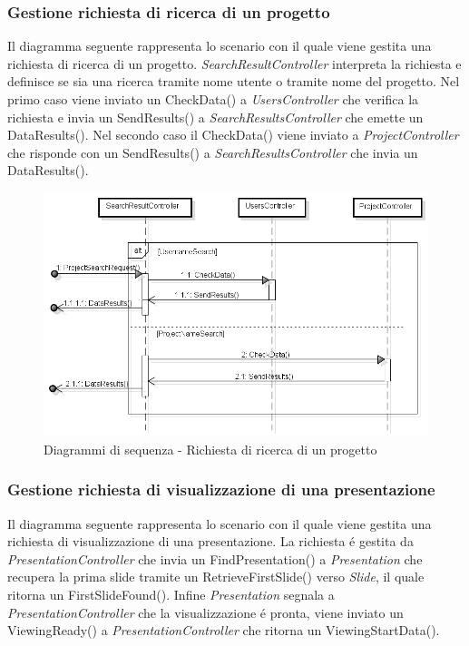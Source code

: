 \subsubsection{Gestione richiesta di ricerca di un progetto}
Il diagramma seguente rappresenta lo scenario con il quale viene gestita una richiesta di ricerca di un progetto. \textit{SearchResultController} interpreta la richiesta e definisce se sia una ricerca tramite nome utente o tramite nome del progetto. Nel primo caso viene inviato un CheckData() a \textit{UsersController} che verifica la richiesta e invia un SendResults() a \textit{SearchResultsController} che emette un DataResults(). Nel secondo caso il CheckData() viene inviato a \textit{ProjectController} che risponde con un SendResults() a \textit{SearchResultsController} che invia un DataResults().
\newpage
\begin{figure}[H]
	\centering
	\includegraphics[scale=0.5]{img/search.png}
	\caption{Diagrammi di sequenza - Richiesta di ricerca di un progetto}
\end{figure}

\subsubsection{Gestione richiesta di visualizzazione di una presentazione}
Il diagramma seguente rappresenta lo scenario con il quale viene gestita una richiesta di visualizzazione di una presentazione. La richiesta é gestita da \textit{PresentationController} che invia un FindPresentation() a \textit{Presentation} che recupera la prima slide tramite un RetrieveFirstSlide() verso \textit{Slide}, il quale ritorna un FirstSlideFound(). Infine \textit{Presentation} segnala a \textit{PresentationController} che la visualizzazione é pronta, viene inviato un ViewingReady() a \textit{PresentationController} che ritorna un ViewingStartData().

